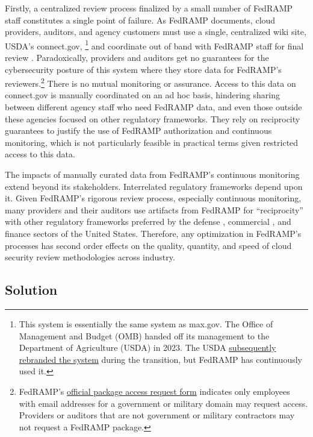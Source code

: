 \documentclass{jdf}
\begin{document}
Firstly, a centralized review process finalized by a small number of FedRAMP staff constitutes a single point of failure. As FedRAMP documents, cloud providers, auditors, and agency customers must use a single, centralized wiki site, USDA's connect.gov, \footnote{This system is essentially the same system as max.gov. The Office of Management and Budget (OMB) handed off its management to the Department of Agriculture (USDA) in 2023. The USDA \href{https://web.archive.org/web/20250617003410/https://www.fedramp.gov/2023-11-13-usda-connect-update-to-fedramp-stakeholders/}{subsequently rebranded the system} during the transition, but FedRAMP has continuously used it.} and coordinate out of band with FedRAMP staff for final review \citeyear[pp.~3,14]{fedramp_auth_playbook25}. Paradoxically, providers and auditors get no guarantees for the cybersecurity posture of this system where they store data for FedRAMP's reviewers.\footnote{FedRAMP's \href{https://web.archive.org/web/20250710063213/https://www.fedramp.gov/assets/resources/documents/Agency_Package_Request_Form.pdf}{official package access request form} indicates only employees with email addresses for a government or military domain may request access. Providers or auditors that are not government or military contractors may not request a FedRAMP package.} There is no mutual monitoring or assurance. Access to this data on connect.gov is manually coordinated on an ad hoc basis, hindering sharing between different agency staff who need FedRAMP data, and even those outside these agencies focused on other regulatory frameworks. They rely on reciprocity guarantees to justify the use of FedRAMP authorization and continuous monitoring, which is not particularly feasible in practical terms given restricted access to this data.

The impacts of manually curated data from FedRAMP's continuous monitoring extend beyond its stakeholders. Interrelated regulatory frameworks depend upon it. Given FedRAMP's rigorous review process, especially continuous monitoring, many providers and their auditors use artifacts from FedRAMP for ``reciprocity'' with other regulatory frameworks preferred by the defense \cite{dod_fedramp_memo23}, commercial \cite{orock21}, and finance sectors of the United States. Therefore, any optimization in FedRAMP's processes has second order effects on the quality, quantity, and speed of cloud security review methodologies across industry.

\subsection{Solution}
\end{document}
